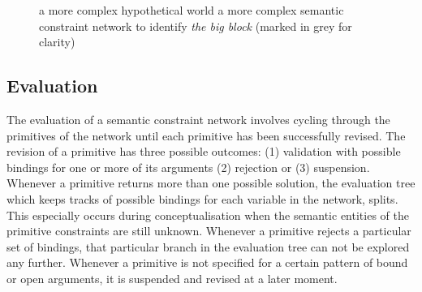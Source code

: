 \begin{figure}[htbp]
\centering
{}
\caption[Example semantic constraint network for \textit{the big
block}]{ a more complex hypothetical
  world  a more complex semantic
  constraint network to identify \textit{the big block} (marked in grey for
  clarity)}
\label{f:more-complex-context-and-network}
\end{figure}

\subsection{Evaluation}

The evaluation of a semantic constraint network involves cycling
through the primitives of the network until each primitive has been
successfully revised. The revision of a primitive has three possible
outcomes: (1) validation with possible bindings for one or more of its
arguments (2) rejection or (3) suspension. Whenever a primitive
returns more than one possible solution, the evaluation tree which
keeps tracks of possible bindings for each variable in the network,
splits. This especially occurs during conceptualisation when the
semantic entities of the primitive constraints are still
unknown. Whenever a primitive rejects a particular set of bindings,
that particular branch in the evaluation tree can not be explored any
further. Whenever a primitive is not specified for a certain pattern
of bound or open arguments, it is suspended and revised at a later
moment.

